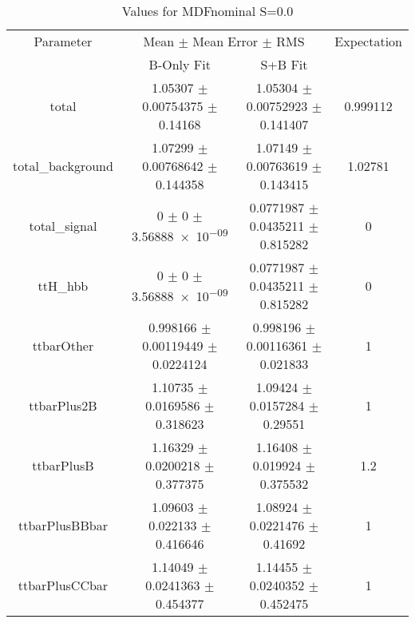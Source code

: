 \begin{table}
\centering
\caption{Values for MDFnominal S=0.0}
\begin{tabular}{cccc}
\toprule
Parameter & \multicolumn{2}{c}{Mean $\pm$ Mean Error $\pm$ RMS} & Expectation\\
 & B-Only Fit & S+B Fit & \\
\midrule
total & \num{1.05307} $\pm$ \num{0.00754375} $\pm$ \num{0.14168} & \num{1.05304} $\pm$ \num{0.00752923} $\pm$ \num{0.141407} & \num{0.999112}\\
total\_background & \num{1.07299} $\pm$ \num{0.00768642} $\pm$ \num{0.144358} & \num{1.07149} $\pm$ \num{0.00763619} $\pm$ \num{0.143415} & \num{1.02781}\\
total\_signal & \num{0} $\pm$ \num{0} $\pm$ \num{3.56888e-09} & \num{0.0771987} $\pm$ \num{0.0435211} $\pm$ \num{0.815282} & \num{0}\\
ttH\_hbb & \num{0} $\pm$ \num{0} $\pm$ \num{3.56888e-09} & \num{0.0771987} $\pm$ \num{0.0435211} $\pm$ \num{0.815282} & \num{0}\\
ttbarOther & \num{0.998166} $\pm$ \num{0.00119449} $\pm$ \num{0.0224124} & \num{0.998196} $\pm$ \num{0.00116361} $\pm$ \num{0.021833} & \num{1}\\
ttbarPlus2B & \num{1.10735} $\pm$ \num{0.0169586} $\pm$ \num{0.318623} & \num{1.09424} $\pm$ \num{0.0157284} $\pm$ \num{0.29551} & \num{1}\\
ttbarPlusB & \num{1.16329} $\pm$ \num{0.0200218} $\pm$ \num{0.377375} & \num{1.16408} $\pm$ \num{0.019924} $\pm$ \num{0.375532} & \num{1.2}\\
ttbarPlusBBbar & \num{1.09603} $\pm$ \num{0.022133} $\pm$ \num{0.416646} & \num{1.08924} $\pm$ \num{0.0221476} $\pm$ \num{0.41692} & \num{1}\\
ttbarPlusCCbar & \num{1.14049} $\pm$ \num{0.0241363} $\pm$ \num{0.454377} & \num{1.14455} $\pm$ \num{0.0240352} $\pm$ \num{0.452475} & \num{1}\\
\bottomrule
\end{tabular}
\end{table}